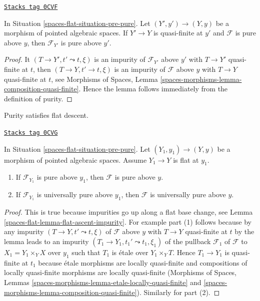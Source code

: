 \begin{lemma}
\label{spaces-flat-lemma-quasi-finite-base-change}
\href{https://stacks.math.columbia.edu/tag/0CVF}{\texttt{Stacks tag 0CVF}}

In Situation \ref{spaces-flat-situation-pre-pure}.
Let $(Y', y') \to (Y, y)$ be a morphism of pointed algebraic spaces.
If $Y' \to Y$ is quasi-finite at $y'$ and $\mathcal{F}$ is pure above $y$,
then $\mathcal{F}_{Y'}$ is pure above $y'$.
\end{lemma}

\begin{proof}
It $(T \to Y', t' \leadsto t, \xi)$ is an impurity of
$\mathcal{F}_{Y'}$ above $y'$ with $T \to Y'$ quasi-finite at $t$,
then $(T \to Y, t' \to t, \xi)$ is an impurity of $\mathcal{F}$
above $y$ with $T \to Y$ quasi-finite at $t$, see
Morphisms of Spaces, Lemma
\ref{spaces-morphisms-lemma-composition-quasi-finite}.
Hence the lemma follows immediately from the definition of purity.
\end{proof}

Purity satisfies flat descent.

\begin{lemma}
\label{spaces-flat-lemma-flat-descend-pure}
\href{https://stacks.math.columbia.edu/tag/0CVG}{\texttt{Stacks tag 0CVG}}

In Situation \ref{spaces-flat-situation-pre-pure}.
Let $(Y_1, y_1) \to (Y, y)$ be a morphism of pointed algebraic spaces.
Assume $Y_1 \to Y$ is flat at $y_1$.
\begin{enumerate}
\item If $\mathcal{F}_{Y_1}$ is pure above $y_1$,
then $\mathcal{F}$ is pure above $y$.
\item If $\mathcal{F}_{Y_1}$ is universally pure above $y_1$,
then $\mathcal{F}$ is universally pure above $y$.
\end{enumerate}
\end{lemma}

\begin{proof}
This is true because impurities go up along a flat base change, see
Lemma \ref{spaces-flat-lemma-flat-ascent-impurity}. For example
part (1) follows because by any impurity $(T \to Y, t' \leadsto t, \xi)$
of $\mathcal{F}$ above $y$ with $T \to Y$ quasi-finite at $t$
by the lemma leads to an impurity
$(T_1 \to Y_1, t_1' \leadsto t_1, \xi_1)$ of the pullback
$\mathcal{F}_1$ of $\mathcal{F}$ to $X_1 = Y_1 \times_Y X$
over $y_1$ such that $T_1$ is \'etale over $Y_1 \times_Y T$.
Hence $T_1 \to Y_1$ is quasi-finite at $t_1$ because
\'etale morphisms are locally quasi-finite and compositions
of locally quasi-finite morphisms are locally quasi-finite
(Morphisms of Spaces, Lemmas
\ref{spaces-morphisms-lemma-etale-locally-quasi-finite} and
\ref{spaces-morphisms-lemma-composition-quasi-finite}).
Similarly for part (2).
\end{proof}

